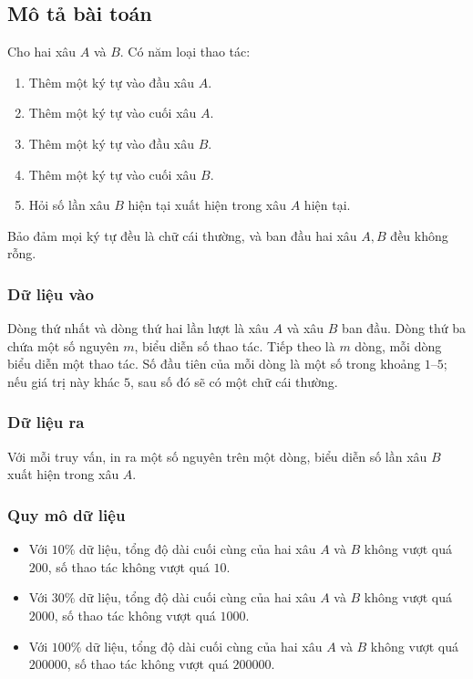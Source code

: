\documentclass[11pt]{article}
\begin{document}
\subsection{Mô tả bài toán}

Cho hai xâu \(A\) và \(B\). Có năm loại thao tác:
\begin{enumerate}
  \item Thêm một ký tự vào đầu xâu \(A\).
  \item Thêm một ký tự vào cuối xâu \(A\).
  \item Thêm một ký tự vào đầu xâu \(B\).
  \item Thêm một ký tự vào cuối xâu \(B\).
  \item Hỏi số lần xâu \(B\) hiện tại xuất hiện trong xâu \(A\) hiện tại.
\end{enumerate}

Bảo đảm mọi ký tự đều là chữ cái thường, và ban đầu hai xâu \(A,B\) đều không
rỗng.

\subsubsection{Dữ liệu vào}

Dòng thứ nhất và dòng thứ hai lần lượt là xâu \(A\) và xâu \(B\) ban đầu.
Dòng thứ ba chứa một số nguyên \(m\), biểu diễn số thao tác. Tiếp theo là
\(m\) dòng, mỗi dòng biểu diễn một thao tác. Số đầu tiên của mỗi dòng là một
số trong khoảng \(1\)--\(5\); nếu giá trị này khác \(5\), sau số đó sẽ có một
chữ cái thường.

\subsubsection{Dữ liệu ra}

Với mỗi truy vấn, in ra một số nguyên trên một dòng, biểu diễn số lần xâu
\(B\) xuất hiện trong xâu \(A\).

\subsubsection{Quy mô dữ liệu}

\begin{itemize}
  \item Với \(10\%\) dữ liệu, tổng độ dài cuối cùng của hai xâu \(A\) và
  \(B\) không vượt quá \(200\), số thao tác không vượt quá \(10\).
  \item Với \(30\%\) dữ liệu, tổng độ dài cuối cùng của hai xâu \(A\) và
  \(B\) không vượt quá \(2000\), số thao tác không vượt quá \(1000\).
  \item Với \(100\%\) dữ liệu, tổng độ dài cuối cùng của hai xâu \(A\) và
  \(B\) không vượt quá \(200000\), số thao tác không vượt quá \(200000\).
\end{itemize}
\end{document}
